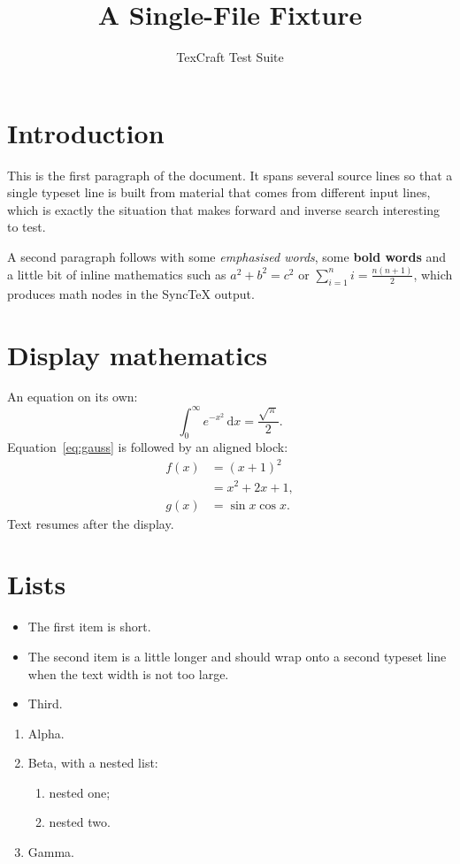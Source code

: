 \documentclass[11pt]{article}
\title{A Single-File Fixture}
\author{TexCraft Test Suite}
\date{}
\begin{document}
\maketitle

\section{Introduction}
This is the first paragraph of the document. It spans several
source lines so that a single typeset line is built from material
that comes from different input lines, which is exactly the situation
that makes forward and inverse search interesting to test.

A second paragraph follows with some \emph{emphasised words}, some
\textbf{bold words} and a little bit of inline mathematics such as
$a^2 + b^2 = c^2$ or $\sum_{i=1}^{n} i = \frac{n(n+1)}{2}$, which
produces math nodes in the SyncTeX output.

\section{Display mathematics}
An equation on its own:
\begin{equation}
  \int_0^\infty e^{-x^2}\,\mathrm{d}x = \frac{\sqrt{\pi}}{2}.
  \label{eq:gauss}
\end{equation}
Equation~\eqref{eq:gauss} is followed by an aligned block:
\begin{align}
  f(x) &= (x+1)^2 \\
       &= x^2 + 2x + 1, \\
  g(x) &= \sin x \cos x.
\end{align}
Text resumes after the display.

\section{Lists}
\begin{itemize}
  \item The first item is short.
  \item The second item is a little longer and should wrap onto a
        second typeset line when the text width is not too large.
  \item Third.
\end{itemize}
\begin{enumerate}
  \item Alpha.
  \item Beta, with a nested list:
  \begin{enumerate}
    \item nested one;
    \item nested two.
  \end{enumerate}
  \item Gamma.
\end{enumerate}
\end{document}
